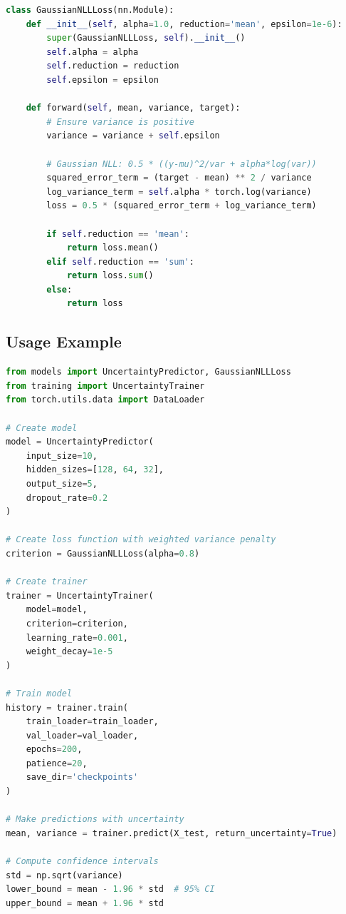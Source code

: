 \documentclass[11pt,a4paper]{article}
\begin{document}
\begin{lstlisting}[language=Python, caption=Loss function implementation]
class GaussianNLLLoss(nn.Module):
    def __init__(self, alpha=1.0, reduction='mean', epsilon=1e-6):
        super(GaussianNLLLoss, self).__init__()
        self.alpha = alpha
        self.reduction = reduction
        self.epsilon = epsilon

    def forward(self, mean, variance, target):
        # Ensure variance is positive
        variance = variance + self.epsilon

        # Gaussian NLL: 0.5 * ((y-mu)^2/var + alpha*log(var))
        squared_error_term = (target - mean) ** 2 / variance
        log_variance_term = self.alpha * torch.log(variance)
        loss = 0.5 * (squared_error_term + log_variance_term)

        if self.reduction == 'mean':
            return loss.mean()
        elif self.reduction == 'sum':
            return loss.sum()
        else:
            return loss
\end{lstlisting}

\subsection{Usage Example}

\begin{lstlisting}[language=Python, caption=Training example]
from models import UncertaintyPredictor, GaussianNLLLoss
from training import UncertaintyTrainer
from torch.utils.data import DataLoader

# Create model
model = UncertaintyPredictor(
    input_size=10,
    hidden_sizes=[128, 64, 32],
    output_size=5,
    dropout_rate=0.2
)

# Create loss function with weighted variance penalty
criterion = GaussianNLLLoss(alpha=0.8)

# Create trainer
trainer = UncertaintyTrainer(
    model=model,
    criterion=criterion,
    learning_rate=0.001,
    weight_decay=1e-5
)

# Train model
history = trainer.train(
    train_loader=train_loader,
    val_loader=val_loader,
    epochs=200,
    patience=20,
    save_dir='checkpoints'
)

# Make predictions with uncertainty
mean, variance = trainer.predict(X_test, return_uncertainty=True)

# Compute confidence intervals
std = np.sqrt(variance)
lower_bound = mean - 1.96 * std  # 95% CI
upper_bound = mean + 1.96 * std
\end{lstlisting}
\end{document}
